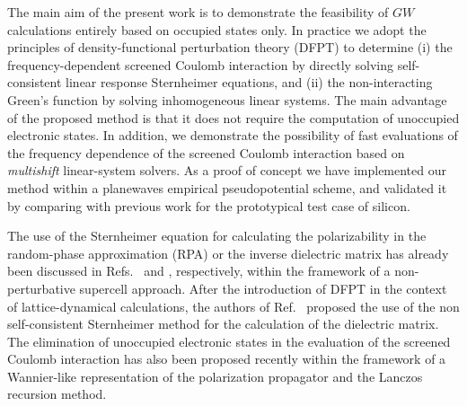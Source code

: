 \documentclass[twocolumn,prb,showpacs,superscriptaddress]{revtex4}
\begin{document}
The main aim of the present work is to demonstrate the feasibility of $GW$ calculations
entirely based on occupied states only.\cite{baroni.rmp}
In practice we adopt the principles of density-functional perturbation theory (DFPT) 
to determine (i) the frequency-dependent screened Coulomb interaction
by directly solving self-consistent linear response Sternheimer equations,
and (ii) the non-interacting Green's function by solving
inhomogeneous linear systems. The main advantage of the proposed method 
is that it does not require the computation of unoccupied electronic states.
In addition, we demonstrate the possibility of fast evaluations of 
the frequency dependence of the screened Coulomb interaction
based on {\it multishift} linear-system solvers.\cite{frommer}
As a proof of concept we have implemented our method within
a planewaves empirical pseudopotential scheme,\cite{cohen_berg} 
and validated it by comparing with previous work for the prototypical test case of silicon.

The use of the Sternheimer equation for calculating the polarizability
in the random-phase approximation (RPA) or the inverse dielectric matrix 
has already been discussed in Refs.\  and ,
respectively, 
within the framework of a non-perturbative supercell approach. After the introduction 
of DFPT in the context of lattice-dynamical calculations,\cite{giannozzi} 
the authors of Ref.\  proposed the
use of the non self-consistent Sternheimer method for the calculation
of the dielectric matrix. The elimination of unoccupied electronic states
in the evaluation of the screened Coulomb interaction has also been 
proposed recently within the framework of a Wannier-like representation
of the polarization propagator and the Lanczos recursion method.\cite{umari1,umari2}
\end{document}
